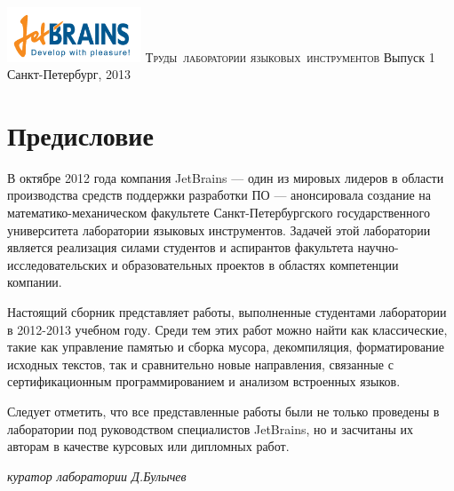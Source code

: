 \documentclass[runningheads]{jblab}
\begin{document}
\newcommand{\Issue}[0]{1}
\newcommand{\Year}[0]{2013}
\sloppy

\begin{titlepage}

\centering

\includegraphics[width=4cm]{JBLogoWhite.png}
\vskip 2cm
\mbox{\Large{\textsc{Труды лаборатории}}}
\vskip 0.5cm
\mbox{\Large{\textsc{языковых инструментов}}}
\vskip 2.5cm
\large{Выпуск \Issue}
\vskip 6cm
\large{Санкт-Петербург, \Year}
\end{titlepage}

\thispagestyle{empty}
\phantom{xx}
\pagebreak

\chapter*{Предисловие}

В октябре 2012 года компания JetBrains --- один из мировых лидеров в области 
производства средств поддержки разработки ПО --- анонсировала создание на
математико-механическом факультете Санкт-Петербургского государственного университета
лаборатории языковых инструментов. Задачей этой лаборатории является реализация
силами студентов и аспирантов факультета научно-исследовательских и образовательных 
проектов в областях компетенции компании.

Настоящий сборник представляет работы, выполненные студентами лаборатории в 2012-2013 учебном году.
Среди тем этих работ можно найти как классические, такие как управление памятью и сборка 
мусора, декомпиляция, форматирование исходных текстов, так и сравнительно 
новые направления, связанные с сертификационным программированием и анализом 
встроенных языков.

Следует отметить, что все представленные работы были не только проведены в лаборатории 
под руководством специалистов JetBrains, но и засчитаны их авторам 
в качестве курсовых или дипломных работ. 
\vskip 2cm
\begin{flushright}
\textit{куратор лаборатории Д.Булычев}
\end{flushright}

\tableofcontents














\end{document}
